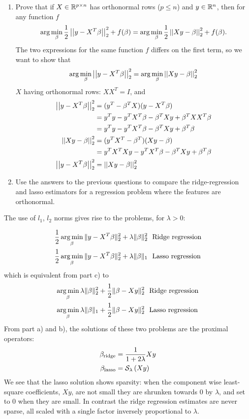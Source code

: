 \documentclass[12pt,twoside]{article}
\begin{document}
\begin{enumerate}
\begin{enumerate}
    \item Prove that if $X \in \mathbb{R}^{p \times n}$ has orthonormal rows ($p \leq n$) and $y \in \mathbb{R}^{n}$, then for any function $f$
\begin{align}
\arg \min_{\beta} \frac{1}{2} \left|\left|  y - X^T\beta  \right|\right| _{2}^2 + f(\beta) = \arg \min_{\beta} \frac{1}{2} \left|\left|  Xy - \beta  \right|\right| _{2}^2 + f(\beta).
\end{align}
The two expressions for the same function $f$ differs on the first term, so we want to show that
$$
\arg \min_{\beta} \left|\left|  y - X^T\beta  \right|\right| _{2}^2  =  \arg \min_{\beta} \left|\left|  Xy - \beta  \right|\right| _{2}^2
$$
$X$ having orthonormal rows: $X X^T = I$, and
\begin{align*}
	\left|\left|  y - X^T\beta  \right|\right| _{2}^2  	&= (y^T -\beta^T X) (y - X^T\beta) \\
						  	&= y^T y - y^T X^T \beta - \beta^T X y + \beta^T X X^T \beta \\
						  	&=   y^T y - y^T X^T \beta - \beta^T X y +  \beta^T \beta \\
	 \left|\left|  Xy - \beta  \right|\right| _{2}^2 		&= (y^T X^T - \beta^T) (Xy - \beta) \\
	 						&= y^T X^T X y - y^T X^T \beta - \beta^T X y +  \beta^T \beta \\
	\left|\left|  y - X^T\beta  \right|\right| _{2}^2  	&= 	 \left|\left|  Xy - \beta  \right|\right| _{2}^2 \\					
\end{align*}

\item Use the answers to the previous questions to compare the ridge-regression and lasso estimators for a regression problem where the features are orthonormal.
  \end{enumerate}
The use of $l_1$, $l_2$ norms gives rise to the problems, for $\lambda > 0$:

\begin{align*}
\frac{1}{2} \operatorname*{arg\,min}_\beta \| y - X^T \beta\|_2^2 + \lambda \|\beta\|_2^2	& \text{~ Ridge regression} \\
\frac{1}{2} \operatorname*{arg\,min}_\beta \| y - X^T \beta\|_2^2 + \lambda \|\beta\|_1	& \text{~ Lasso regression}
\end{align*} 
which is equivalent from part c) to
\begin{align*}
 \operatorname*{arg\,min}_\beta  \lambda \|\beta\|_2^2 + \frac{1}{2} \| \beta - X y \|_2^2 	& \text{~ Ridge regression} \\
 \operatorname*{arg\,min}_\beta   \lambda \|\beta\|_1+    \frac{1}{2} \| \beta - X y \|_2^2 	& \text{~ Lasso regression}
\end{align*} 
From part a) and b), the solutions of these two problems are the proximal operators:
\begin{align*}
	\beta_{\text{ridge}}	&= 	 \frac{1} {1+2 \lambda} X y \\
	\beta_{\text{lasso}}	&= 	  \mathcal{ S }_{\lambda}\left( X y \right)\\
\end{align*} 
We see that the lasso solution shows sparsity: when the component wise least-square coefficients, $X y$, are not small they are shrunken towards $0$ by $\lambda$, and set to $0$ when they are small.
In contrast the ridge regression estimates are never sparse, all scaled with a single factor inversely proportional to $\lambda$.
 

\end{enumerate}
\end{document}
